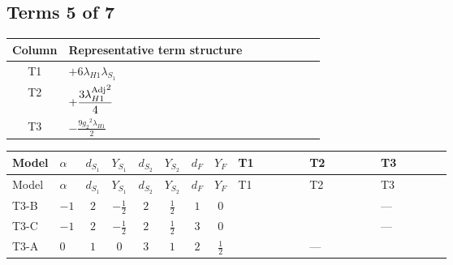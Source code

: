 \documentclass[8pt]{article}
\begin{document}
\begin{landscape}
\subsection*{Terms 5 of 7}
\begin{center}
\begin{tabular}{@{}c >{\raggedright\arraybackslash}p{0.82\linewidth}@{}}
\toprule
Column & Representative term structure \\
\midrule
T1 & \(\displaystyle +6 {\lambda_{H1}} {\lambda_{S_1}}\) \\
\midrule
T2 & \(\displaystyle +\frac{3 {\lambda_{H1}^{\rm Adj}}^2}{4}\) \\
\midrule
T3 & \(\displaystyle -\frac{9 {g_2}^2 {\lambda_{H1}}}{2}\) \\
\midrule
\bottomrule
\end{tabular}
\end{center}
\smallskip
\tiny
\begin{longtable}{@{}llcccccc >{\raggedright\arraybackslash}p{0.21\linewidth} >{\raggedright\arraybackslash}p{0.21\linewidth} >{\raggedright\arraybackslash}p{0.21\linewidth}@{}}
\toprule
Model & $\alpha$ & $d_{S_1}$ & $Y_{S_1}$ & $d_{S_2}$ & $Y_{S_2}$ & $d_F$ & $Y_F$ & T1 & T2 & T3 \\
\midrule
\endfirsthead
\toprule
Model & $\alpha$ & $d_{S_1}$ & $Y_{S_1}$ & $d_{S_2}$ & $Y_{S_2}$ & $d_F$ & $Y_F$ & T1 & T2 & T3 \\
\midrule
\endhead
T3-B & $-1$ & $2$ & $-\frac{1}{2}$ & $2$ & $\frac{1}{2}$ & $1$ & $0$ & \scriptsize\adjustbox{max width=\linewidth}{$\begin{gathered} +6 {\lambda_{H1}} {\lambda_{S_1}}\end{gathered}$} & \scriptsize\adjustbox{max width=\linewidth}{$\begin{gathered} +\frac{3 {\lambda_{H1}^{\rm Adj}}^2}{4}\end{gathered}$} & --- \\
\midrule
T3-C & $-1$ & $2$ & $-\frac{1}{2}$ & $2$ & $\frac{1}{2}$ & $3$ & $0$ & \scriptsize\adjustbox{max width=\linewidth}{$\begin{gathered} +6 {\lambda_{H1}} {\lambda_{S_1}}\end{gathered}$} & \scriptsize\adjustbox{max width=\linewidth}{$\begin{gathered} +\frac{3 {\lambda_{H1}^{\rm Adj}}^2}{4}\end{gathered}$} & --- \\
\midrule
T3-A & $0$ & $1$ & $0$ & $3$ & $1$ & $2$ & $\frac{1}{2}$ & \scriptsize\adjustbox{max width=\linewidth}{$\begin{gathered} +4 {\lambda_{H1}} {\lambda_{S_1}}\end{gathered}$} & --- & \scriptsize\adjustbox{max width=\linewidth}{$\begin{gathered} -\frac{9 {g_2}^2 {\lambda_{H1}}}{2}\end{gathered}$} \\

\end{longtable}
\end{landscape}
\end{document}
